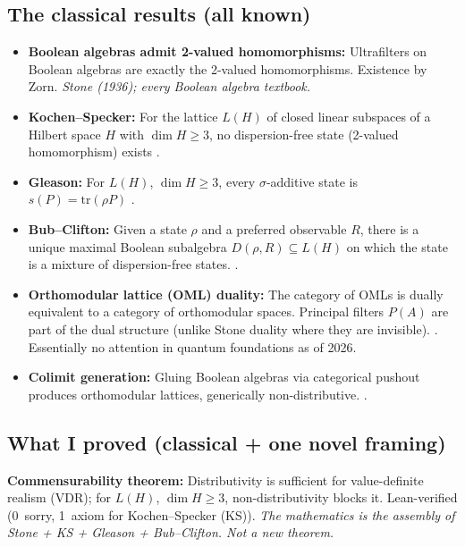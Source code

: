 \subsection{The classical results (all known)}

\begin{itemize}
  \item \textbf{Boolean algebras admit 2-valued homomorphisms:}
    Ultrafilters on Boolean algebras are exactly the 2-valued
    homomorphisms.  Existence by Zorn.
    \emph{Stone (1936); every Boolean algebra textbook.}

  \item \textbf{Kochen--Specker:} For the lattice $L(H)$ of closed
    linear subspaces of a Hilbert space $H$ with $\dim H \geq 3$,
    no dispersion-free state (2-valued homomorphism) exists
    \cite{KochenSpecker1967}.

  \item \textbf{Gleason:} For $L(H)$, $\dim H \geq 3$, every
    $\sigma$-additive state is $s(P) = \mathrm{tr}(\rho P)$
    \cite{Gleason1957}.

  \item \textbf{Bub--Clifton:} Given a state $\rho$ and a
    preferred observable $R$, there is a unique maximal Boolean
    subalgebra $D(\rho, R) \subseteq L(H)$ on which the state is
    a mixture of dispersion-free states.
    \cite{BubClifton1996, HalvorsonClifton1999}.

  \item \textbf{Orthomodular lattice (OML) duality:} The category
    of OMLs is dually equivalent to a category of orthomodular
    spaces.  Principal filters $P(A)$ are part of the dual
    structure (unlike Stone duality where they are invisible).
    \cite{McDonaldBimbo2023}.  Essentially no attention in quantum
    foundations as of 2026.

  \item \textbf{Colimit generation:} Gluing Boolean algebras via
    categorical pushout produces orthomodular lattices, generically
    non-distributive.
    \cite{Gunji2026}.
\end{itemize}

\subsection{What I proved (classical + one novel framing)}

\textbf{Commensurability theorem:} Distributivity is sufficient
for value-definite realism (VDR); for $L(H)$, $\dim H \geq 3$,
non-distributivity blocks it.  Lean-verified (0~sorry, 1~axiom for
Kochen--Specker (KS)).  \emph{The mathematics is the assembly of
Stone + KS + Gleason + Bub--Clifton.
Not a new theorem.}

